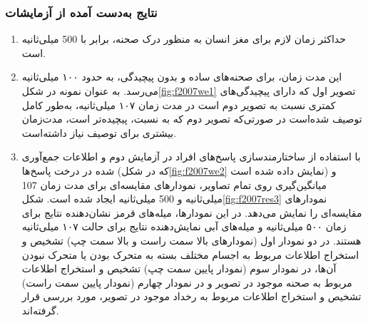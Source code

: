 \subsubsection{نتایج به‌دست‌ آمده از آزمایشات}
\begin{enumerate}
	\item
	حداکثر زمان لازم برای مغز انسان به منظور درک صحنه، برابر با 500 میلی‌ثانیه است.
	\item
	این مدت زمان، برای صحنه‌های ساده‌ و بدون پیچیدگی، به حدود ۱۰۰ میلی‌ثانیه می‌رسد. به عنوان نمونه در شکل\ref{fig:f2007we1} تصویر اول که دارای پیچیدگی‌های کمتری نسبت به تصویر دوم است در مدت زمان ۱۰۷ میلی‌ثانیه، به‌طور کامل توصیف شده‌است در صورتی‌که تصویر دوم که به نسبت، پیچیده‌تر است، مدت‌زمان بیشتری برای توصیف نیاز داشته‌است.
	\item
	با استفاده از ساختارمندسازی پاسخ‌های افراد در آزمایش دوم و اطلاعات جمع‌آوری شده در درخت پاسخ‌ها (که در شکل\ref{fig:f2007we2} نمایش‌ داده شده است) و میانگین‌گیری روی تمام تصاویر، نمودارهای مقایسه‌ای برای مدت زمان 107 میلی‌ثانیه و 500 میلی‌ثانیه ایجاد شده‌ است. شکل\ref{fig:f2007res3}
	نمودارهای مقایسه‌ای را نمایش‌ می‌دهد. در این نمودارها، میله‌های قرمز نشان‌دهنده نتایج برای زمان ۵۰۰ میلی‌ثانیه و میله‌های آبی نمایش‌دهنده نتایج برای حالت ۱۰۷ میلی‌ثانیه هستند.
	در دو نمودار اول (نمودارهای بالا سمت راست و بالا سمت چپ) تشخیص و استخراج اطلاعات مربوط به اجسام مختلف بسته به متحرک بودن یا متحرک نبودن آن‌ها، در نمودار سوم (نمودار پایین سمت چپ) تشخیص و استخراج اطلاعات مربوط به صحنه موجود در تصویر و در نمودار چهارم‌ (نمودار پایین سمت راست) تشخیص و استخراج اطلاعات مربوط به رخداد موجود در تصویر، مورد بررسی قرار گرفته‌اند.
	

\end{enumerate}
